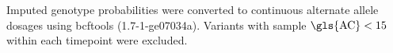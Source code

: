Imputed genotype probabilities were converted to continuous alternate allele dosages using bcftools (1.7-1-ge07034a).
Variants with sample $\text{\gls{AC}} < 15$ within each timepoint were excluded.
%

